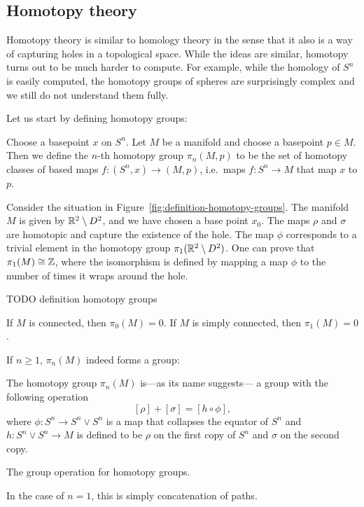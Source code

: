 \subsection*{Homotopy theory}
Homotopy theory is similar to homology theory in the sense that it also is a way of capturing holes in a topological space.
While the ideas are similar, homotopy turns out to be much harder to compute.
For example, while the homology of $S^{n}$ is easily computed, the homotopy groups of spheres are surprisingly complex and we still do not understand them fully.

Let us start by defining homotopy groups:

\begin{definition}
    Choose a basepoint $x$ on $S^{n}$.
    Let $M$ be a manifold and choose a basepoint $p \in M$.
    Then we define the $n$-th homotopy group $\pi_n(M, p)$ to be the set of homotopy classes of based maps  $f: (S^{n}, x) \to  (M, p)$, i.e.\ maps $f: S^{n} \to  M$ that map $x$ to $p$.
\end{definition}
\begin{eg}
    Consider the situation in Figure~\ref{fig:definition-homotopy-groups}.
    The manifold $M$ is given by $\mathbb{R}^2 \setminus D^2$, and we have chosen a base point $x_0$.
    The maps $\rho$ and  $\sigma$ are homotopic and capture the existence of the hole.
    The map $\phi$ corresponds to a trivial element in the homotopy group  $\pi_1(\mathbb{R}^2 \setminus D^2)$.
    One can prove that $\pi_1(M) \cong \mathbb{Z}$, where the isomorphism is defined by mapping a map $\phi$ to the number of times it wraps around the hole.
\end{eg}
\begin{marginfigure}
    \centering
    \caption{TODO definition homotopy groups}
    \label{fig:definition-homotopy-groups}
\end{marginfigure}
\begin{eg}
    If $M$ is connected, then  $\pi_0(M) = 0$.
    If  $M$ is simply connected, then  $\pi_1(M) = 0$.
\end{eg}

If $n \ge  1$, $\pi_n(M)$ indeed forms a group:
\begin{prop}
    The homotopy group $\pi_n(M)$ is---as its name suggests--- a group with the following operation
    \[
        [\rho] + [\sigma] = [h  \circ  \phi]
    ,\] 
    where $\phi : S^{n} \to  S^{n} \vee S^{n}$ is a map that collapses the equator of $S^{n}$ and $h : S^{n} \vee S^{n} \to  M$ is defined to be $\rho$ on the first copy of  $S^{n}$ and $\sigma$ on the second copy.
\end{prop}
\begin{marginfigure}
    \centering
    \caption{The group operation for homotopy groups.}
    \label{fig:fundamental-group-operation}
\end{marginfigure}
\begin{remark}
    In the case of $n=1$, this is simply concatenation of paths.
\end{remark}

